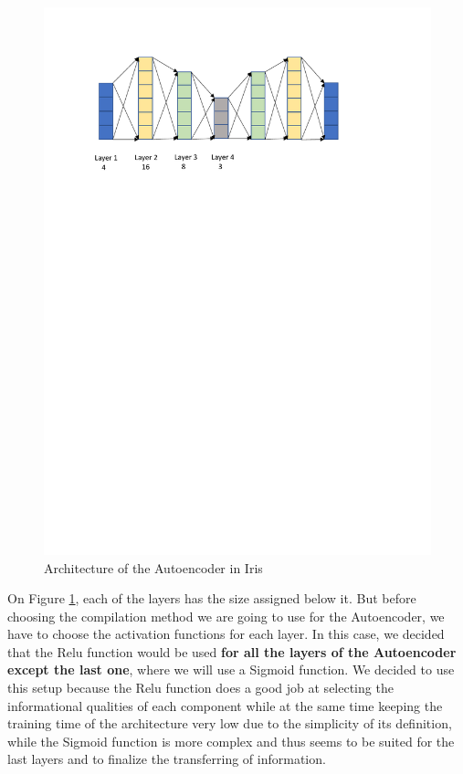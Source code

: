 \begin{figure}[H]
	\centering
	\includegraphics[width=17cm]{Figuras_tfg/Autoencoder_Results}
	\caption{Architecture of the Autoencoder in Iris}
	\label{fig:figure_autoencoder_Iris}
\end{figure}

On Figure \ref{fig:figure_autoencoder_Iris}, each of the layers has the size assigned below it. But before choosing the compilation method we are going to use for the Autoencoder, we have to choose the activation functions for each layer. In this case, we decided that the Relu function would be used \textbf{for all the layers of the Autoencoder except the last one}, where we will use a Sigmoid function. We decided to use this setup because the Relu function does a good job at selecting the informational qualities of each component while at the same time keeping the training time of the architecture very low due to the simplicity of its definition, while the Sigmoid function is more complex and thus seems to be suited for the last layers and to finalize the transferring of information. \par

